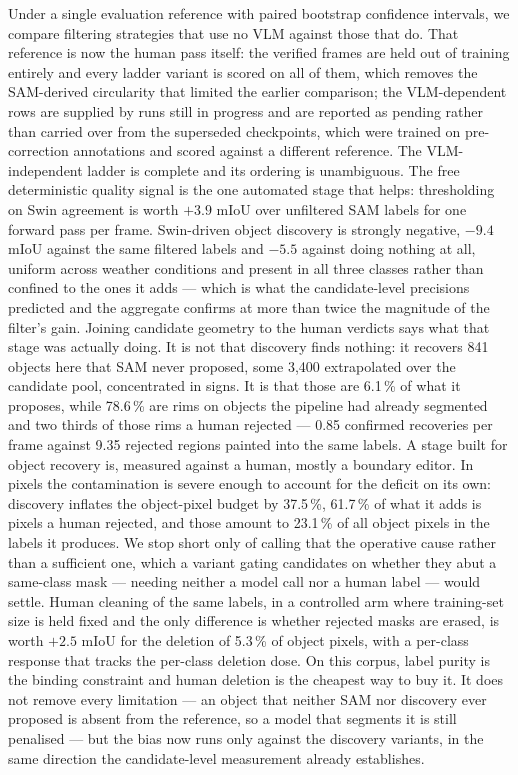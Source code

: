 \documentclass[conference]{IEEEtran}
\begin{document}
Under a single evaluation reference with paired bootstrap confidence intervals, we compare filtering strategies that use no VLM against those that do. That reference is now the human pass itself: the verified frames are held out of training entirely and every ladder variant is scored on all of them, which removes the SAM-derived circularity that limited the earlier comparison; the VLM-dependent rows are supplied by runs still in progress and are reported as pending rather than carried over from the superseded checkpoints, which were trained on pre-correction annotations and scored against a different reference.
The VLM-independent ladder is complete and its ordering is unambiguous. The free deterministic quality signal is the one automated stage that helps: thresholding on Swin agreement is worth $+3.9$ mIoU over unfiltered SAM labels for one forward pass per frame. Swin-driven object discovery is strongly negative, $-9.4$ mIoU against the same filtered labels and $-5.5$ against doing nothing at all, uniform across weather conditions and present in all three classes rather than confined to the ones it adds --- which is what the candidate-level precisions predicted and the aggregate confirms at more than twice the magnitude of the filter's gain.
Joining candidate geometry to the human verdicts says what that stage was actually doing. It is not that discovery finds nothing: it recovers 841 objects here that SAM never proposed, some 3{,}400 extrapolated over the candidate pool, concentrated in signs. It is that those are 6.1\,\% of what it proposes, while 78.6\,\% are rims on objects the pipeline had already segmented and two thirds of those rims a human rejected --- 0.85 confirmed recoveries per frame against 9.35 rejected regions painted into the same labels. A stage built for object recovery is, measured against a human, mostly a boundary editor. In pixels the contamination is severe enough to account for the deficit on its own: discovery inflates the object-pixel budget by 37.5\,\%, 61.7\,\% of what it adds is pixels a human rejected, and those amount to 23.1\,\% of all object pixels in the labels it produces. We stop short only of calling that the operative cause rather than a sufficient one, which a variant gating candidates on whether they abut a same-class mask --- needing neither a model call nor a human label --- would settle.
Human cleaning of the same labels, in a controlled arm where training-set size is held fixed and the only difference is whether rejected masks are erased, is worth $+2.5$ mIoU for the deletion of 5.3\,\% of object pixels, with a per-class response that tracks the per-class deletion dose. On this corpus, label purity is the binding constraint and human deletion is the cheapest way to buy it.
It does not remove every limitation --- an object that neither SAM nor discovery ever proposed is absent from the reference, so a model that segments it is still penalised --- but the bias now runs only against the discovery variants, in the same direction the candidate-level measurement already establishes.
\end{document}
